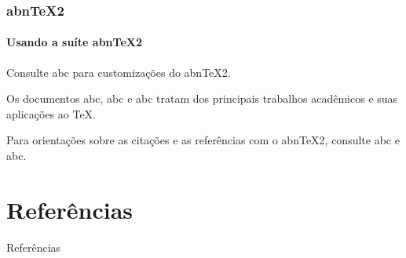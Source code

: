 \documentclass[aspectratio=169]{beamer}
\begin{document}
\begin{frame}
\frametitle{abnTeX2}
\framesubtitle{Usando a suíte abnTeX2}

Consulte abc para customizações do abnTeX2.
\vspace{0.5cm}

Os documentos abc,
abc e abc tratam dos
principais trabalhos acadêmicos e suas aplicações ao TeX.
\vspace{0.5cm}

Para orientações sobre as citações e as referências com o abnTeX2, consulte
abc e abc.
\vspace{0.5cm}

\end{frame}

\section{Referências}


\begin{frame}[allowframebreaks]{Referências}

\end{frame}

\end{document}
